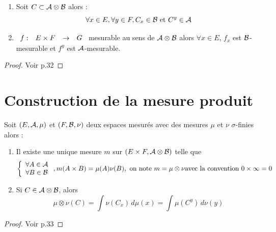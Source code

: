 \documentclass[]{report}
\begin{document}
\begin{prop}{}{}
    \begin{enumerate}
        \item Soit $C\subset \mathcal{A}\otimes \mathcal{B}$ alors :
        \[\forall x\in E, \forall y\in F,C_x\in\mathcal{B}\text{ et }C^y\in\mathcal{A}\]
        \item $\begin{array}{ccccc} f : & E\times F & \to & G \end{array}$ mesurable au sens de $\mathcal{A}\otimes \mathcal{B}$ alors $\forall x\in E$, $f_x$ est $\mathcal{B}$-mesurable et $f^y$ est $\mathcal{A}$-mesurable.
    \end{enumerate}
\end{prop}

\begin{proof}{}{}
    Voir p.32
\end{proof}

\section{Construction de la mesure produit}

\begin{tm}{}{}
    Soit $(E,\mathcal{A},\mu)$ et $(F,\mathcal{B},\nu)$ deux espaces mesurés avec des mesures $\mu$ et $\nu$ $\sigma$-finies alors :
    \begin{enumerate}
        \item Il existe une unique mesure $m$ sur $(E\times F,\mathcal{A}\otimes\mathcal{B})$ telle que
        \[\left\{\begin{array}{ll} \forall A\in\mathcal{A}\\ \forall B\in\mathcal{B} \end{array} \right., m(A\times B)=\mu(A)\nu(B),\text{ on note }m=\mu\otimes\nu\text{avec la convention $0\times\infty=0$}\]
        \item Si $C\in\mathcal{A}\otimes\mathcal{B}$, alors
        \[\mu\otimes\nu (C)=\int\nu(C_x)\,d\mu(x)=\int\mu(C^y)\,d\nu(y)\]
    \end{enumerate}
\end{tm}

\begin{proof}{}{}
    Voir p.33
\end{proof}

\begin{re}{}{}
\end{re}
\end{document}
